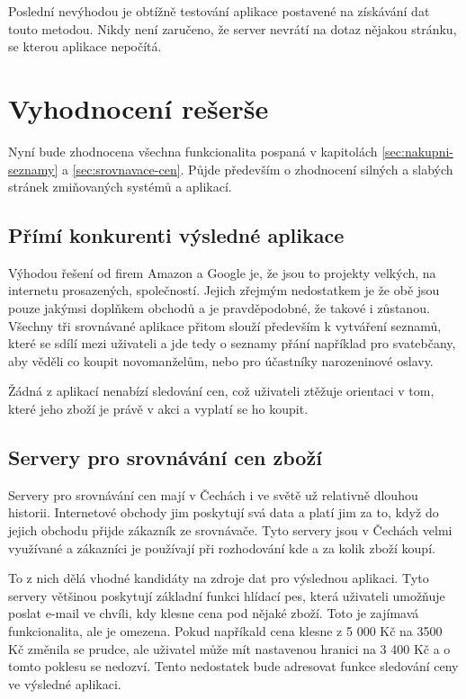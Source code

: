 Poslední nevýhodou je obtížně testování aplikace postavené na získávání dat touto metodou. Nikdy není zaručeno, že server nevrátí na dotaz nějakou stránku, se kterou aplikace nepočítá.

\section{Vyhodnocení rešerše}
Nyní bude zhodnocena všechna funkcionalita pospaná v kapitolách \ref{sec:nakupni-seznamy} a \ref{sec:srovnavace-cen}. Půjde především o zhodnocení silných a slabých stránek zmiňovaných systémů a aplikací. 


\subsection{Přímí konkurenti výsledné aplikace}
Výhodou řešení od firem Amazon a Google je, že jsou to projekty velkých, na internetu prosazených, společností. Jejich zřejmým nedostatkem je že obě jsou pouze jakýmsi doplňkem obchodů a je pravděpodobné, že takové i zůstanou. Všechny tři srovnávané aplikace přitom slouží především k vytváření seznamů, které se sdílí mezi uživateli a jde tedy o seznamy přání například pro svatebčany, aby věděli co koupit novomanželům, nebo pro účastníky narozeninové oslavy.

Žádná z aplikací nenabízí sledování cen, což uživateli ztěžuje orientaci v tom, které jeho zboží je právě v akci a vyplatí se ho koupit.
\subsection{Servery pro srovnávání cen zboží}
Servery pro srovnávání cen mají v Čechách i ve světě už relativně dlouhou historii. Internetové obchody jim poskytují svá data a platí jim za to, když do jejich obchodu přijde zákazník ze srovnávače. Tyto servery jsou v Čechách velmi využívané a zákazníci je používají při rozhodování kde a za kolik zboží koupí.

To z nich dělá vhodné kandidáty na zdroje dat pro výslednou aplikaci. Tyto servery většinou poskytují základní funkci hlídací pes, která uživateli umožňuje poslat e-mail ve chvíli, kdy klesne cena pod nějaké zboží. Toto je zajímavá funkcionalita, ale je omezena. Pokud napříkald cena klesne z 5 000 Kč na 3500 Kč změnila se prudce, ale uživatel může mít nastavenou hranici na 3 400 Kč a o tomto poklesu se nedozví. Tento nedostatek bude adresovat funkce sledování ceny ve výsledné aplikaci.

